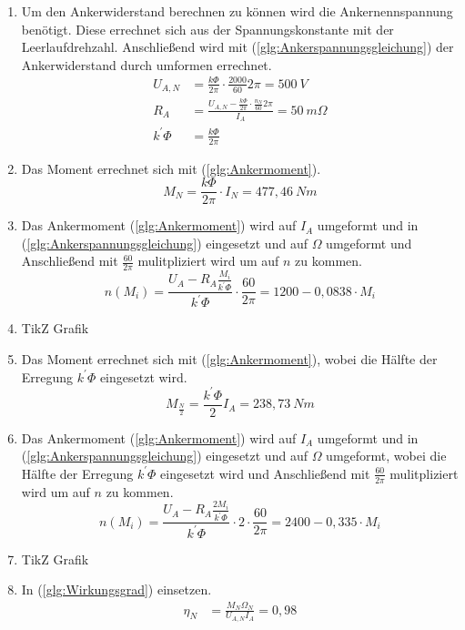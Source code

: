 \begin{solution}
\begin{enumerate}
\item Um den Ankerwiderstand berechnen zu können wird die Ankernennspannung benötigt. Diese errechnet sich aus der Spannungskonstante mit der Leerlaufdrehzahl. Anschließend wird mit (\ref{glg:Ankerspannungsgleichung}) der Ankerwiderstand durch umformen errechnet.\\
\begin{align}
U_{A,N} &= \frac{k \Phi}{2 \pi} \cdot \frac{2000}{60} 2 \pi = 500~V\\
R_A &= \frac{U_{A,N} - \frac{k \Phi}{2 \pi} \cdot \frac{n_N}{60} 2 \pi}{I_A}=50~m \Omega\\
k^{'}\Phi&= \frac{k \Phi}{2 \pi}
\end{align}
\item Das Moment errechnet sich mit (\ref{glg:Ankermoment}).\\
\begin{equation}
M_N=\frac{k \Phi}{2 \pi} \cdot I_N =477,46~Nm
\end{equation}
\item Das Ankermoment (\ref{glg:Ankermoment}) wird auf $I_A$ umgeformt und in (\ref{glg:Ankerspannungsgleichung}) eingesetzt und auf $\Omega$ umgeformt und Anschließend mit $\frac{60}{2 \pi}$ mulitpliziert wird um auf $n$ zu kommen.
\begin{equation}
n(M_i) = \frac{U_A - R_A \frac{M_i}{k^{'} \Phi}}{k^{'}\Phi} \cdot \frac{60}{2 \pi}=1200-0,0838 \cdot M_i
\end{equation}
\item TikZ Grafik
\item Das Moment errechnet sich mit (\ref{glg:Ankermoment}), wobei die Hälfte der Erregung $k^{'} \Phi$ eingesetzt wird.
\begin{equation}
M_{\frac{N}{2}} = \frac{k^{'}\Phi}{2} I_A =238,73~Nm
\end{equation}
\item Das Ankermoment (\ref{glg:Ankermoment}) wird auf $I_A$ umgeformt und in (\ref{glg:Ankerspannungsgleichung}) eingesetzt und auf $\Omega$ umgeformt, wobei die Hälfte der Erregung $k^{'} \Phi$ eingesetzt wird und Anschließend mit $\frac{60}{2 \pi}$ mulitpliziert wird um auf $n$ zu kommen.
\begin{equation}
n(M_i) = \frac{U_A - R_A \frac{2 M_i}{k^{'} \Phi}}{k^{'}\Phi} \cdot 2 \cdot \frac{60}{2 \pi} =2400-0,335 \cdot M_i
\end{equation}
\item TikZ Grafik
\item In (\ref{glg:Wirkungsgrad}) einsetzen.
\begin{align}
\eta_N &= \frac{M_N \Omega_N}{U_{A,N} I_A} = 0,98
\end{align}
\end{enumerate}
\end{solution}